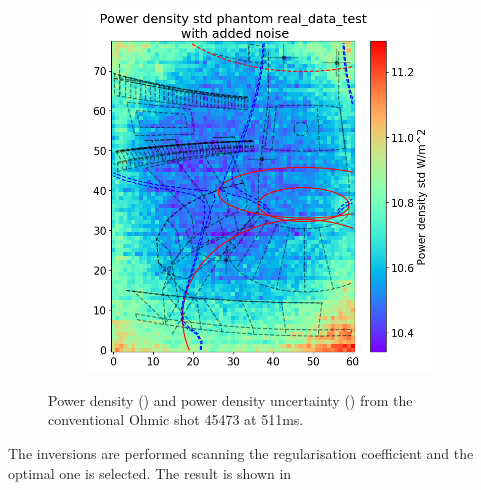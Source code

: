 \begin{figure}
\begin{subfigure}{0.45\linewidth}
         \centering
         \includegraphics[trim={0 0 0 45},clip,width=\textwidth]{Chapters/chapter2/figs/inversion_comparison_foil_power_std_real_data_test.png}
         \caption{}
         \label{fig:real_phantom1b}
     \end{subfigure}
    \caption{Power density () and power density uncertainty () from the conventional Ohmic shot 45473 at 511ms.}
    \label{fig:real_phantom1}
\end{figure}

The inversions are performed scanning the regularisation coefficient and the optimal one is selected. The result is shown in 


